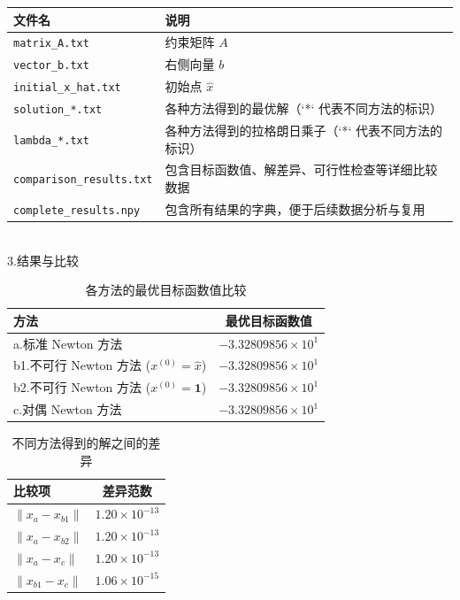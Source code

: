 \documentclass{article}
\newenvironment{solution_cn}{%
  \begin{proof}[解答]%
  \kaishu  %
}{%
  \end{proof}%
}
\begin{document}
\begin{solution_cn}
\begin{table}[H]
    \begin{tabular}{l>{\raggedright\arraybackslash}p{}}
    \toprule
    \textbf{文件名} & \textbf{说明} \\
    \midrule
    \texttt{matrix\_A.txt} & 约束矩阵 \( A \) \\
    \texttt{vector\_b.txt} & 右侧向量 \( b \) \\
    \texttt{initial\_x\_hat.txt} & 初始点 \( \hat{x} \) \\
    \texttt{solution\_*.txt} & 各种方法得到的最优解（`*` 代表不同方法的标识） \\
    \texttt{lambda\_*.txt} & 各种方法得到的拉格朗日乘子（`*` 代表不同方法的标识） \\
    \texttt{comparison\_results.txt} & 包含目标函数值、解差异、可行性检查等详细比较数据 \\
    \texttt{complete\_results.npy} & 包含所有结果的字典，便于后续数据分析与复用 \\
    \bottomrule
    \end{tabular}
    \label{tab:data_files}
\end{table}
\quad\\
3.结果与比较\\
\begin{table}[H]
\centering
\caption{各方法的最优目标函数值比较}
\begin{tabular}{lc}
\toprule
方法 & 最优目标函数值 \\
\midrule
a.标准 Newton 方法 & \(-3.32809856 \times 10^{1}\) \\
b1.不可行 Newton 方法 (\(x^{(0)} = \hat{x}\)) & \(-3.32809856 \times 10^{1}\) \\
b2.不可行 Newton 方法 (\(x^{(0)} = \mathbf{1}\)) & \(-3.32809856 \times 10^{1}\) \\
c.对偶 Newton 方法 & \(-3.32809856 \times 10^{1}\) \\
\bottomrule
\end{tabular}
\end{table}
\begin{table}[H]
\centering
\caption{不同方法得到的解之间的差异}
\begin{tabular}{lc}
\toprule
比较项 & 差异范数 \\
\midrule
\(\|x_a - x_{b1}\|\) & \(1.20 \times 10^{-13}\) \\
\(\|x_a - x_{b2}\|\) & \(1.20 \times 10^{-13}\) \\
\(\|x_a - x_c\|\) & \(1.20 \times 10^{-13}\) \\
\(\|x_{b1} - x_c\|\) & \(1.06 \times 10^{-15}\) \\

\end{tabular}
\end{table}
\end{solution_cn}
\end{document}
